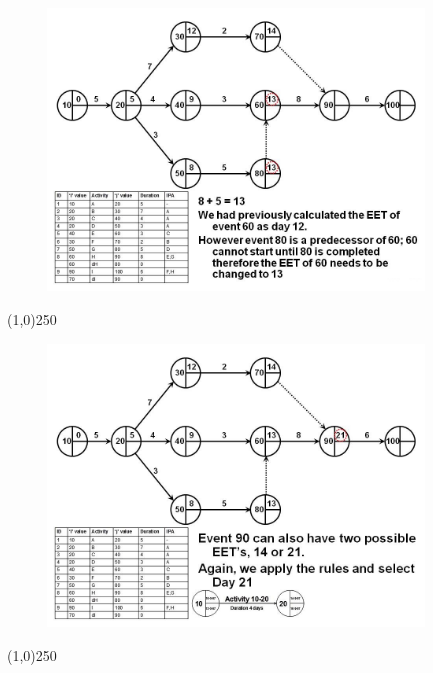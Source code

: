\begin{frame}
\begin{figure}
	\centering
		\includegraphics[width = 10.0cm]{oldnotes/Slide108.jpg}
\end{figure}
\end{frame}
\begin{center}\line(1,0){250}\end{center}


\begin{frame}
\begin{figure}
	\centering
		\includegraphics[width = 10.0cm]{oldnotes/Slide109.jpg}
\end{figure}
\end{frame}
\begin{center}\line(1,0){250}\end{center}


